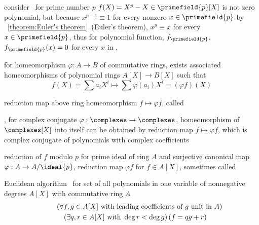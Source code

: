 \documentclass[17pt,landscape]{foils}
\begin{document}
{\vvitem
	consider \ for prime number $p$
	\bit
	\vitem
		$f(X) = X^p - X\in \primefield{p}[X]$ is not zero polynomial,
		but because $x^{p-1} \equiv 1$ for every nonzero $x\in\primefield{p}$
		by \theoremname~\ref{theorem:Euler's theorem}\ (Euler's theorem),
		$x^p\equiv x$ for every $x\in\primefield{p}$,
		thus for polynomial function, $f_{\primefield{p}}$,
		$f_{}(x)=0$ for every $x$ in \primefield{p}
	\vitem
		\ie, 
	\eit
\eit


%

\bit
\item
	for homeomorphism $\varphi:A\to B$ of commutative rings,
	exists associated homeomorphisms
	of polynomial rings $A[X]\to B[X]$
	such that
	$$
		f(X) = \sum a_i X^i
		\mapsto
		\sum \varphi(a_i) X^i
		= (\varphi f)(X)
	$$
\eit

\begin{mydefinition}{reduction map}%
	above ring homeomorphism $f\mapsto \varphi f$,
	called 
\end{mydefinition}

\bit
\item
	\eg, for complex conjugate $\varphi: \complexes \to \complexes$,
		homeomorphism of $\complexes[X]$ into itself
		can be obtained by reduction map $f \mapsto \varphi f$,
		which is complex conjugate of polynomials with complex coefficients
\eit

\begin{mydefinition}{reduction of $f$ modulo $p$}%
	for prime ideal  of ring $A$
	and
	surjective canonical map $\varphi: A \to A/\ideal{p}$,
	reduction map $\varphi f$ for $f\in A[X]$,
	sometimes called \
\end{mydefinition}



\begin{mytheorem}{Euclidean algorithm}%
		\
	for set of all polynomials in one variable of nonnegative degrees $A[X]$
	with commutative ring $A$\
	\begin{eqnarray*}
		\lefteqn{
		\left(
			\forall f,g \in A[X]
			\mbox{ with leading coefficients of } g \mbox{ unit in }A
		\right)
		}
		\\
		&&
		\left(
			\exists q, r \in A[X]
			\mbox{ with } \deg r < \deg g
		\right)
		\left(
			f = qg + r
		\right)
	\end{eqnarray*}
\end{mytheorem}

}
\end{document}
